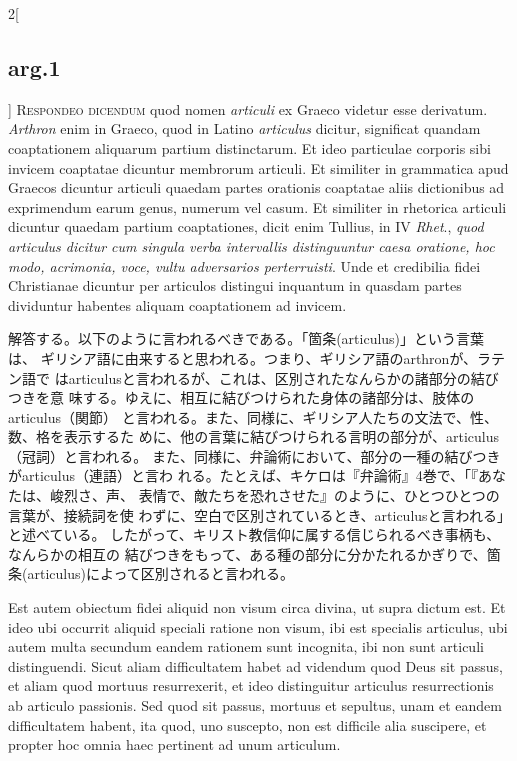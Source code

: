 \documentclass[paper=a4paper,fontsize=10pt,jafontsize=9pt,titlepage]{jlreq}
\begin{document}
\begin{paracol}{2}[\subsection{arg.1}]
{\scshape Respondeo dicendum} quod nomen {\itshape articuli} ex Graeco
videtur esse derivatum. {\itshape Arthron} enim in Graeco, quod in
Latino {\itshape articulus} dicitur, significat quandam coaptationem
aliquarum partium distinctarum. Et ideo particulae corporis sibi invicem
coaptatae dicuntur membrorum articuli. Et similiter in grammatica apud
Graecos dicuntur articuli quaedam partes orationis coaptatae aliis
dictionibus ad exprimendum earum genus, numerum vel casum. Et similiter
in rhetorica articuli dicuntur quaedam partium coaptationes, dicit enim
Tullius, in IV {\itshape Rhet}., {\itshape quod articulus dicitur cum
singula verba intervallis distinguuntur caesa oratione, hoc modo,
acrimonia, voce, vultu adversarios perterruisti}. Unde et credibilia
fidei Christianae dicuntur per articulos distingui inquantum in quasdam
partes dividuntur habentes aliquam coaptationem ad invicem.

\switchcolumn

解答する。以下のように言われるべきである。「箇条(articulus)」という言葉は、
ギリシア語に由来すると思われる。つまり、ギリシア語のarthronが、ラテン語で
はarticulusと言われるが、これは、区別されたなんらかの諸部分の結びつきを意
味する。ゆえに、相互に結びつけられた身体の諸部分は、肢体のarticulus（関節）
と言われる。また、同様に、ギリシア人たちの文法で、性、数、格を表示するた
めに、他の言葉に結びつけられる言明の部分が、articulus（冠詞）と言われる。
また、同様に、弁論術において、部分の一種の結びつきがarticulus（連語）と言わ
れる。たとえば、キケロは『弁論術』4巻で、「『あなたは、峻烈さ、声、
 表情で、敵たちを恐れさせた』のように、ひとつひとつの言葉が、接続詞を使
 わずに、空白で区別されているとき、articulusと言われる」と述べている。
したがって、キリスト教信仰に属する信じられるべき事柄も、なんらかの相互の
 結びつきをもって、ある種の部分に分かたれるかぎりで、箇条(articulus)によって区別されると言われる。

\switchcolumn*

Est autem obiectum fidei aliquid non
visum circa divina, ut supra dictum est. Et ideo ubi occurrit aliquid
speciali ratione non visum, ibi est specialis articulus, ubi autem multa
secundum eandem rationem sunt incognita, ibi non sunt articuli
distinguendi. Sicut aliam difficultatem habet ad videndum quod Deus sit
passus, et aliam quod mortuus resurrexerit, et ideo distinguitur
articulus resurrectionis ab articulo passionis. Sed quod sit passus,
mortuus et sepultus, unam et eandem difficultatem habent, ita quod, uno
suscepto, non est difficile alia suscipere, et propter hoc omnia haec
pertinent ad unum articulum.


\end{paracol}
\end{document}
